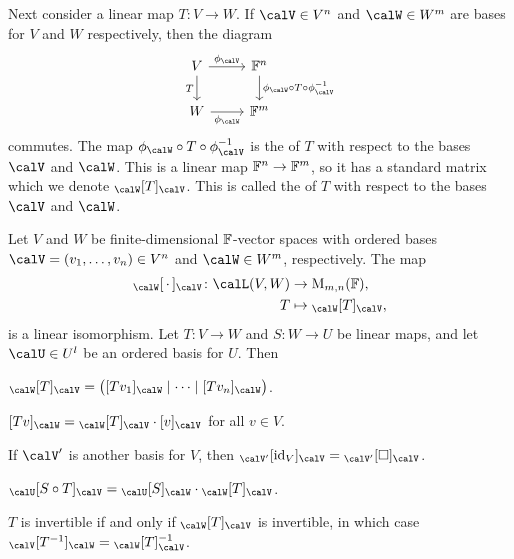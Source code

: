 Next consider a linear map $T \colon V \to W$. If $\calV \in V^n$ and $\calW \in W^m$ are bases for $V$ and $W$ respectively, then the diagram
%
\begin{equation*}
    \begin{tikzcd}
        V
            \ar[d, "T", swap]
            \ar[r, "\coordmap{\calV}"]
        & \fieldF^n
            \ar[d, "\coordmap{\calW} \circ T \circ \inv{\coordmap{\calV}}"] \\
        W
            \ar[r, "\coordmap{\calW}", swap]
        & \fieldF^m
    \end{tikzcd}
\end{equation*}
%
commutes. The map $\coordmap{\calW} \circ T \circ \inv{\coordmap{\calV}}$ is the  of $T$ with respect to the bases $\calV$ and $\calW$. This is a linear map $\mathbb{F}^n \to \mathbb{F}^m$, so it has a standard matrix which we denote $\mr{\calW}{T}{\calV}$. This is called the  of $T$ with respect to the bases $\calV$ and $\calW$.

\begin{proposition}
    \label{prop:mr-properties}
    Let $V$ and $W$ be finite-dimensional $\mathbb{F}$-vector spaces with ordered bases $\calV = (v_1, \ldots, v_n) \in V^n$ and $\calW \in W^m$, respectively. The map
    \begin{align*}
        \mr{\calW}{\,\cdot\,}{\calV} \colon \lin(V,W) &\to \mat{m,n}{\fieldF}, \\
        T &\mapsto \mr{\calW}{T}{\calV},
    \end{align*}
    is a linear isomorphism. Let $T \colon V \to W$ and $S \colon W \to U$ be linear maps, and let $\calU \in U^l$ be an ordered basis for $U$. Then
    \begin{enumproposition}
        \item \label{enum:mr-explicit-formula} $\mr{\calW}{T}{\calV} = \bigl( \coordvec{Tv_1}{\calW} \mid \cdots \mid \coordvec{Tv_n}{\calW} \bigr)$.

        \item \label{enum:mr-vector-multiplication} $\coordvec{Tv}{\calW} = \mr{\calW}{T}{\calV} \cdot \coordvec{v}{\calV}$ for all $v \in V$.

        \item \label{enum:mr-of-identity-map} If $\calV'$ is another basis for $V$, then $\mr{\calV'}{\id_V}{\calV} = \basischangemat{\calV'}{\calV}$.

        \item \label{enum:mr-multiplicative} $\mr{\calU}{S \circ T}{\calV} = \mr{\calU}{S}{\calW} \cdot \mr{\calW}{T}{\calV}$.

        \item \label{enum:mr-invertibility} $T$ is invertible if and only if $\mr{\calW}{T}{\calV}$ is invertible, in which case $\mr{\calV}{\inv{T}}{\calW} = \inv{\mr{\calW}{T}{\calV}}$.
    \end{enumproposition}
\end{proposition}


